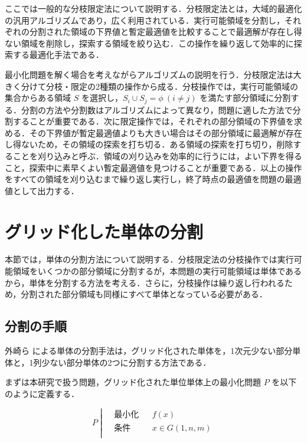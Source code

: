 \documentclass[a4paper,11pt]{jreport}
\begin{document}
ここでは一般的な分枝限定法について説明する．分枝限定法とは，大域的最適化の汎用アルゴリズムであり，広く利用されている．実行可能領域を分割し，それぞれの分割された領域の下界値と暫定最適値を比較することで最適解が存在し得ない領域を削除し，探索する領域を絞り込む．この操作を繰り返して効率的に探索する最適化手法である．\par
最小化問題を解く場合を考えながらアルゴリズムの説明を行う．分枝限定法は大きく分けて分枝・限定の2種類の操作から成る．分枝操作では，実行可能領域の集合からある領域 $ S $ を選択し，$ S_i \cup S_j = \phi \: (i \neq j) $ を満たす部分領域に分割する．分割の方法や分割数はアルゴリズムによって異なり，問題に適した方法で分割することが重要である．次に限定操作では，それぞれの部分領域の下界値を求める．その下界値が暫定最適値よりも大きい場合はその部分領域に最適解が存在し得ないため，その領域の探索を打ち切る．ある領域の探索を打ち切り，削除することを刈り込みと呼ぶ．領域の刈り込みを効率的に行うには，よい下界を得ること，探索中に素早くよい暫定最適値を見つけることが重要である．以上の操作をすべての領域を刈り込むまで繰り返し実行し，終了時点の最適値を問題の最適値として出力する．\par

\section{グリッド化した単体の分割} \label{sec:partition}

本節では，単体の分割方法について説明する．分枝限定法の分枝操作では実行可能領域をいくつかの部分領域に分割するが，本問題の実行可能領域は単体であるから，単体を分割する方法を考える．さらに，分枝操作は繰り返し行われるため，分割された部分領域も同様にすべて単体となっている必要がある．\par

\subsection{分割の手順}

外崎ら \cite{tonosaki} による単体の分割手法は，グリッド化された単体を，1次元少ない部分単体と，1列少ない部分単体の2つに分割する方法である．\par
まずは本研究で扱う問題，グリッド化された単位単体上の最小化問題 $ P $ を以下のように定義する．

$$
P \;
\left| \;
\begin{aligned}
& 最小化 && f(x) \\
& 条件 && x \in G(1, n, m) \\
\end{aligned}
\right.
$$
\end{document}
